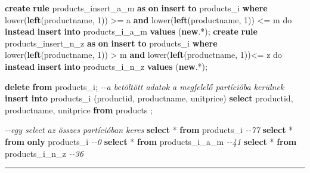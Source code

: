 \documentclass[
  magyar,
]{article}
\newenvironment{Shaded}{}{}
\newcommand{\CommentTok}[1]{\textcolor[rgb]{0.38,0.63,0.69}{\textit{#1}}}
\newcommand{\DecValTok}[1]{\textcolor[rgb]{0.25,0.63,0.44}{#1}}
\newcommand{\FunctionTok}[1]{\textcolor[rgb]{0.02,0.16,0.49}{#1}}
\newcommand{\KeywordTok}[1]{\textcolor[rgb]{0.00,0.44,0.13}{\textbf{#1}}}
\newcommand{\NormalTok}[1]{#1}
\newcommand{\OperatorTok}[1]{\textcolor[rgb]{0.40,0.40,0.40}{#1}}
\newcommand{\StringTok}[1]{\textcolor[rgb]{0.25,0.44,0.63}{#1}}
\begin{document}
\begin{Shaded}
\begin{Highlighting}[]
\KeywordTok{create} \KeywordTok{rule}\NormalTok{ products\_insert\_a\_m }\KeywordTok{as}
   \KeywordTok{on} \KeywordTok{insert} \KeywordTok{to}\NormalTok{ products\_i }\KeywordTok{where} \FunctionTok{lower}\NormalTok{(}\KeywordTok{left}\NormalTok{(productname, }\DecValTok{1}\NormalTok{)) }\OperatorTok{\textgreater{}=} \StringTok{\textquotesingle{}a\textquotesingle{}} \KeywordTok{and}
\FunctionTok{lower}\NormalTok{(}\KeywordTok{left}\NormalTok{(productname, }\DecValTok{1}\NormalTok{)) }\OperatorTok{\textless{}=} \StringTok{\textquotesingle{}m\textquotesingle{}}
\NormalTok{   do }\KeywordTok{instead} \KeywordTok{insert} \KeywordTok{into}\NormalTok{ products\_i\_a\_m }\KeywordTok{values}\NormalTok{ (}\KeywordTok{new}\NormalTok{.}\OperatorTok{*}\NormalTok{);}
\KeywordTok{create} \KeywordTok{rule}\NormalTok{ products\_insert\_n\_z }\KeywordTok{as}
   \KeywordTok{on} \KeywordTok{insert} \KeywordTok{to}\NormalTok{ products\_i }\KeywordTok{where} \FunctionTok{lower}\NormalTok{(}\KeywordTok{left}\NormalTok{(productname, }\DecValTok{1}\NormalTok{)) }\OperatorTok{\textgreater{}} \StringTok{\textquotesingle{}m\textquotesingle{}} \KeywordTok{and}
\FunctionTok{lower}\NormalTok{(}\KeywordTok{left}\NormalTok{(productname, }\DecValTok{1}\NormalTok{))}\OperatorTok{\textless{}=} \StringTok{\textquotesingle{}z\textquotesingle{}}
\NormalTok{   do }\KeywordTok{instead} \KeywordTok{insert} \KeywordTok{into}\NormalTok{ products\_i\_n\_z }\KeywordTok{values}\NormalTok{ (}\KeywordTok{new}\NormalTok{.}\OperatorTok{*}\NormalTok{);}

\KeywordTok{delete} \KeywordTok{from}\NormalTok{ products\_i;}
\CommentTok{{-}{-}a betöltött adatok a megfelelő partícióba kerülnek}
\KeywordTok{insert} \KeywordTok{into}\NormalTok{ products\_i (productid, productname, unitprice)}
   \KeywordTok{select}\NormalTok{ productid, productname, unitprice }\KeywordTok{from}\NormalTok{ products ;}

\CommentTok{{-}{-}egy select az összes partícióban keres}
\KeywordTok{select} \OperatorTok{*} \KeywordTok{from}\NormalTok{ products\_i }\CommentTok{{-}{-}77}
\KeywordTok{select} \OperatorTok{*} \KeywordTok{from} \KeywordTok{only}\NormalTok{ products\_i }\CommentTok{{-}{-}0}
\KeywordTok{select} \OperatorTok{*} \KeywordTok{from}\NormalTok{ products\_i\_a\_m }\CommentTok{{-}{-}41}
\KeywordTok{select} \OperatorTok{*} \KeywordTok{from}\NormalTok{ products\_i\_n\_z }\CommentTok{{-}{-}36}
\end{Highlighting}
\end{Shaded}

\begin{center}\rule{0.5\linewidth}{0.5pt}\end{center}
\end{document}
